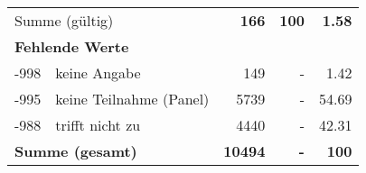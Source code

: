 \begin{longtable}{lXrrr}
     \midrule
     \multicolumn{2}{l}{Summe (gültig)} &
       \textbf{\num{166}} &
     \textbf{\num{100}} &
       \textbf{\num[round-mode=places,round-precision=2]{1.58}} \\
     \multicolumn{5}{l}{\textbf{Fehlende Werte}}\\
       -998 &
       keine Angabe &
         \num{149} &
        - &
         \num[round-mode=places,round-precision=2]{1.42} \\
       -995 &
       keine Teilnahme (Panel) &
         \num{5739} &
        - &
         \num[round-mode=places,round-precision=2]{54.69} \\
       -988 &
       trifft nicht zu &
         \num{4440} &
        - &
         \num[round-mode=places,round-precision=2]{42.31} \\
     \midrule
     \multicolumn{2}{l}{\textbf{Summe (gesamt)}} &
          \textbf{\num{10494}} &
        \textbf{-} &
        \textbf{\num{100}} \\
     \bottomrule
     \end{longtable}
     
